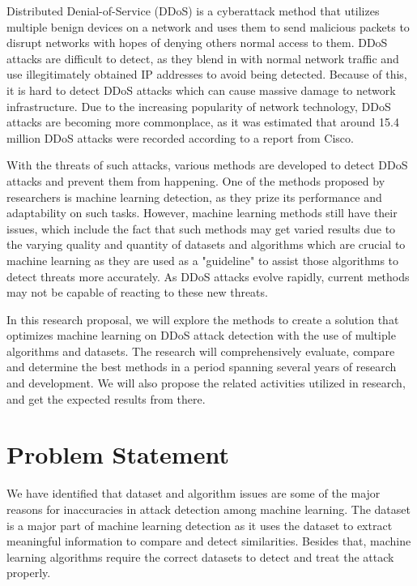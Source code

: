\documentclass[a4paper, 12pt]{article}
\begin{document}
Distributed Denial-of-Service (DDoS) is a cyberattack method that utilizes multiple benign devices on a network and uses them to send malicious packets to disrupt networks with hopes of denying others normal access to them. DDoS attacks are difficult to detect, as they blend in with normal network traffic and use illegitimately obtained IP addresses to avoid being detected.  Because of this, it is hard to detect DDoS attacks which can cause massive damage to network infrastructure. Due to the increasing popularity of network technology, DDoS attacks are becoming more commonplace, as it was estimated that around 15.4 million DDoS attacks were recorded according to a report from Cisco.  

With the threats of such attacks, various methods are developed to detect DDoS attacks and prevent them from happening. One of the methods proposed by researchers is machine learning detection, as they prize its performance and adaptability on such tasks. However, machine learning methods still have their issues, which include the fact that such methods may get varied results due to the varying quality and quantity of datasets and algorithms which are crucial to machine learning as they are used as a "guideline" to assist those algorithms to detect threats more accurately. As DDoS attacks evolve rapidly, current methods may not be capable of reacting to these new threats. 

In this research proposal, we will explore the methods to create a solution that optimizes machine learning on DDoS attack detection with the use of multiple algorithms and datasets. The research will comprehensively evaluate, compare and determine the best methods in a period spanning several years of research and development. We will also propose the related activities utilized in research, and get the expected results from there.

\section{Problem Statement}
We have identified that dataset and algorithm issues are some of the major reasons for inaccuracies in attack detection among machine learning. The dataset is a major part of machine learning detection as it uses the dataset to extract meaningful information to compare and detect similarities. Besides that, machine learning algorithms require the correct datasets to detect and treat the attack properly.  
\end{document}
